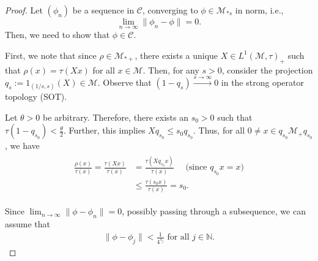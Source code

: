 \documentclass[11pt]{amsart}
\theoremstyle{definition}
\theoremstyle{myremark}
\numberwithin{equation}{section}
\begin{document}
    	\begin{proof}
		Let $(\phi_n)$ be a sequence in $\mathcal{C}$, converging to $\phi \in \mathcal{M}_{*s}$ in norm, i.e.,
		$$ \lim_{n \to \infty} \| \phi_n - \phi \| = 0. $$
		Then, we need to show that $\phi \in \mathcal{C}$. 
		
		First, we note that since $\rho \in \mathcal{M}_{*+}$, there exists a unique $X \in L^1(\mathcal{M}, \tau)_+$ such that $\rho(x) = \tau(Xx)$ for all $x \in \mathcal{M}$. Then, for any $s > 0$, consider the projection $q_s := 1_{(1/s, s)}(X) \in \mathcal{M}$. Observe that $(1 - q_s) \xrightarrow{s \to \infty} 0$ in the strong operator topology (SOT). 
		
		Let $\theta > 0$ be arbitrary. Therefore, there exists an $s_0 > 0$ such that $\tau(1 - q_{s_0}) < \frac{\theta}{2}$. Further, this implies $X q_{s_0} \leq s_0 q_{s_0}$. Thus, for all $0 \neq x \in q_{s_0} \mathcal{M}_+ q_{s_0}$, we have 
		\begin{align}\label{rho-tau}
			\begin{split}
				\frac{\rho(x)}{\tau(x)} = \frac{\tau(Xx)}{\tau(x)}&= \frac{\tau(X q_{s_0} x)}{\tau(x)} \quad \text{ (since $q_{s_0} x = x$)}\\
				&\leq \frac{\tau(s_0 x)}{\tau(x)} = s_0.
			\end{split} 
		\end{align}
		
		Since $ \lim_{n \to \infty} \| \phi - \phi_n \| = 0 $, possibly passing through a subsequence, we can assume that 
		\begin{align*}\label{coneq-3}
			\|\phi - \phi_j\| < \frac{1}{4^{s_j}} \text{ for all } j \in \mathbb{N}.
		\end{align*}
		

\end{proof}
\end{document}
